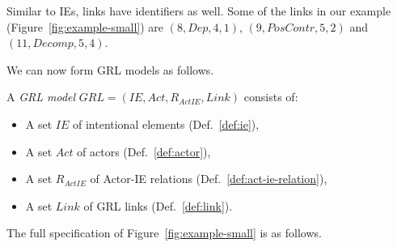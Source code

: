 
Similar to IEs, links have identifiers as well. Some of the links in our example (Figure~\ref{fig:example-small}) are $(8, Dep, 4, 1)$, $(9, PosContr, 5, 2)$ and $(11, Decomp, 5, 4)$.


We can now form GRL models as follows.

\begin{definition}
\label{def:grl-model}
A \emph{GRL model} $GRL=(IE, Act, R_{ActIE}, Link)$ consists of:
\begin{itemize}
\item A set $IE$ of intentional elements (Def.~\ref{def:ie}),
\item A set $Act$ of actors (Def.~\ref{def:actor}),
\item A set $R_{ActIE}$ of Actor-IE relations (Def.~\ref{def:act-ie-relation}),
\item A set $Link$ of GRL links (Def.~\ref{def:link}).
\end{itemize}
\end{definition}

The full specification of Figure~\ref{fig:example-small} is as follows. 

